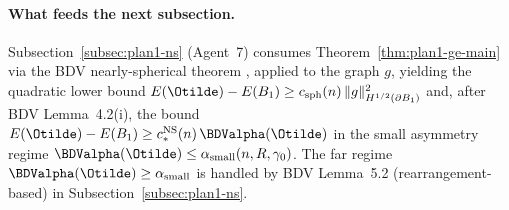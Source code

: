 \paragraph{What feeds the next subsection.}
Subsection~\ref{subsec:plan1-ns} (Agent~7) consumes
Theorem~\ref{thm:plan1-ge-main} via the BDV nearly-spherical theorem
\cite[Theorem~3.3]{BDV}, applied to the graph \(g\), yielding the
quadratic lower bound
\(E(\Otilde)-E(B_1)\ge c_{\rm sph}(n)\,\|g\|_{H^{1/2}(\partial B_1)}^2\)
and, after BDV Lemma~4.2(i), the bound
\(E(\Otilde)-E(B_1)\ge c_*^{\rm NS}(n)\,\BDValpha(\Otilde)\) in the small
asymmetry regime \(\BDValpha(\Otilde)\le\alpha_{\rm small}(n,R,\gamma_0)\).
The far regime \(\BDValpha(\Otilde)\ge\alpha_{\rm small}\) is handled by
BDV Lemma~5.2 (rearrangement-based) in Subsection~\ref{subsec:plan1-ns}.
